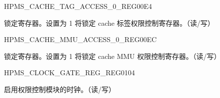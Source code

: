 \begin{register}{H}{PMS\_CACHE\_TAG\_ACCESS\_0\_REG}{\hexprefix{}00E4}\label{regdesc:PMSCACHETAGACCESS0REG}
%
%
\regnewline%
\begin{regdesc}\begin{reglist}
\label{fielddesc:PMSCACHETAGACCESSLOCK}\item [PMS\_CACHE\_TAG\_ACCESS\_LOCK] 锁定寄存器。设置为 1 将锁定 cache 标签权限控制寄存器。（读/写）
\end{reglist}\end{regdesc}
\end{register}


\begin{register}{H}{PMS\_CACHE\_MMU\_ACCESS\_0\_REG}{\hexprefix{}00EC}\label{regdesc:PMSCACHEMMUACCESS0REG}
%
%
\regnewline%
\begin{regdesc}\begin{reglist}
\label{fielddesc:PMSCACHEMMUACCESSLOCK}\item [PMS\_CACHE\_MMU\_ACCESS\_LOCK] 锁定寄存器。设置为 1 将锁定 cache MMU 权限控制寄存器。（读/写）
\end{reglist}\end{regdesc}
\end{register}


\begin{register}{H}{PMS\_CLOCK\_GATE\_REG\_REG}{\hexprefix{}0104}\label{regdesc:PMSCLOCKGATEREGREG}
%
%
\regnewline%
\begin{regdesc}\begin{reglist}
\label{fielddesc:PMSCLKEN}\item [PMS\_CLK\_EN] 启用权限控制模块的时钟。（读/写）
\end{reglist}\end{regdesc}
\end{register}


